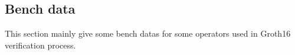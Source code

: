 \subsection{Bench data} \label{sec:bench-data}

This section mainly give some bench datas for some operators used in Groth16 verification process.



